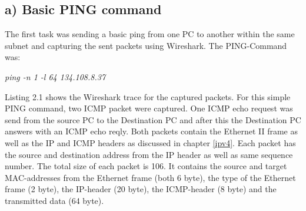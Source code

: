 \subsection{a) Basic PING command}
\label{first-ping}
The first task was sending a basic ping from one PC to another within the same subnet and capturing the sent packets using Wireshark. The PING-Command was:
\begin{center}
	\textit{ping -n 1 -l 64 134.108.8.37}
\end{center}
Listing 2.1 shows the Wireshark trace for the captured packets. For this simple PING command, two ICMP packet were captured. One ICMP echo request was send from the source PC to the Destination PC and after this the Destination PC answers with an ICMP echo reqly. Both packets contain the Ethernet II frame as well as the IP and ICMP headers as discussed in chapter \ref{ipv4}. Each packet has the source and destination address from the IP header as well as same sequence number. The total size of each packet is 106. It contains the source and target MAC-addresses from the Ethernet frame (both 6 byte), the type of the Ethernet frame (2 byte), the IP-header (20 byte), the ICMP-header (8 byte) and the transmitted data (64 byte).

